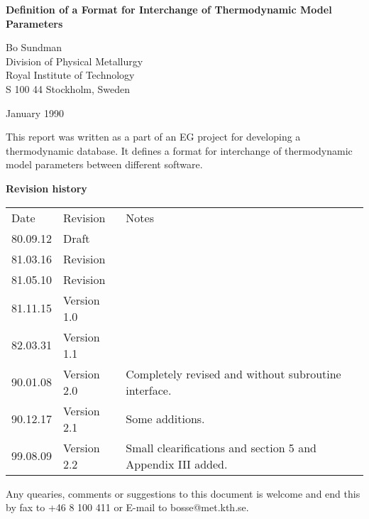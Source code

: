 \documentclass[12pt]{article}
\begin{document}
\begin{center}



{\Large \bf Definition of a Format for Interchange of
Thermodynamic Model Parameters}

\vspace{20mm}

Bo Sundman\\
Division of Physical Metallurgy\\
Royal Institute of Technology\\
S 100 44 Stockholm, Sweden\\[5mm]

\vspace{40mm}

January 1990
\end{center}

\newpage

This report was written as a part of an EG project for developing a
thermodynamic database.  It defines a format for interchange of
thermodynamic model parameters between different software.

\vspace{5mm}
{\bf Revision history}

\begin{tabular}{lll}
Date       & Revision    &  Notes \\
80.09.12   &  Draft &\\
81.03.16   &  Revision&\\
81.05.10   &  Revision&\\
81.11.15   &  Version 1.0&\\
82.03.31   &  Version 1.1&\\
90.01.08   & Version 2.0 &Completely revised and without subroutine interface.\\
90.12.17   &  Version 2.1 &Some additions.\\
99.08.09   &  Version 2.2 &Small clearifications and section 5 and Appendix III added.\\
\end{tabular}

\vspace{30mm}

Any quearies, comments or suggestions to this document is welcome and
end this by fax to +46 8 100 411 or E-mail to bosse@met.kth.se.

\newpage

\tableofcontents

\newpage
\end{document}
